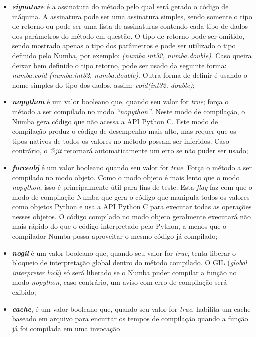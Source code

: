 \documentclass[
	12pt,				%
	twoside,			%
	a4paper,			%
	english,			%
	french,				%
	spanish,			%
	brazil				%
	]{abntex2}
\begin{document}
\begin{itemize}
\item
  \textbf{\emph{signature}} é a assinatura do método pelo qual será
  gerado o código de máquina. A assinatura pode ser uma assinatura
  simples, sendo somente o tipo de retorno ou pode ser uma lista de
  assinaturas contendo cada tipo de dados dos parâmetros do método em
  questão. O tipo de retorno pode ser omitido, sendo mostrado apenas o
  tipo dos parâmetros e pode ser utilizado o tipo definido pelo Numba,
  por exemplo: \emph{(numba.int32, numba.double)}. Caso queira deixar
  bem definido o tipo retorno, pode ser usado da seguinte forma:
  \emph{numba.void (numba.int32, numba.double)}. Outra forma de definir
  é usando o nome simples do tipo dos dados, assim: \emph{void(int32,
  double)};
\item
  \textbf{\emph{nopython}} é um valor booleano que, quando seu valor for
  \emph{true}; força o método a ser compilado no modo
  \emph{``nopython''}. Neste modo de compilação, o Numba gera código que
  não acessa a API Python C. Este modo de compilação produz o código de
  desempenho mais alto, mas requer que os tipos nativos de todos os
  valores no método possam ser inferidos. Caso contrário, o \emph{@jit}
  retornará automaticamente um erro se não puder ser usado;
\item
  \textbf{\emph{forceobj}} é um valor booleano quando seu valor for
  \emph{true}. Força o método a ser compilado no modo objeto. Como o
  modo objeto é mais lento que o modo \emph{nopython}, isso é
  principalmente útil para fins de teste. Esta \emph{flag} faz com que o
  modo de compilação Numba que gera o código que manipula todos os
  valores como objetos Python e usa a API Python C para executar todas
  as operações nesses objetos. O código compilado no modo objeto
  geralmente executará não mais rápido do que o código interpretado pelo
  Python, a menos que o compilador Numba possa aproveitar o mesmo código
  já compilado;
\item
  \textbf{\emph{nogil}} é um valor booleano que, quando seu valor for
  \emph{true}, tenta liberar o bloqueio de interpretação global dentro
  do método compilado. O GIL (\emph{global interpreter lock}) só será
  liberado se o Numba puder compilar a função no modo \emph{nopython},
  caso contrário, um aviso com erro de compilação será exibido;
\item
  \textbf{\emph{cache}}, é um valor booleano que, quando seu valor for
  \emph{true}, habilita um cache baseado em arquivo para encurtar os
  tempos de compilação quando a função já foi compilada em uma invocação

\end{itemize}
\end{document}
